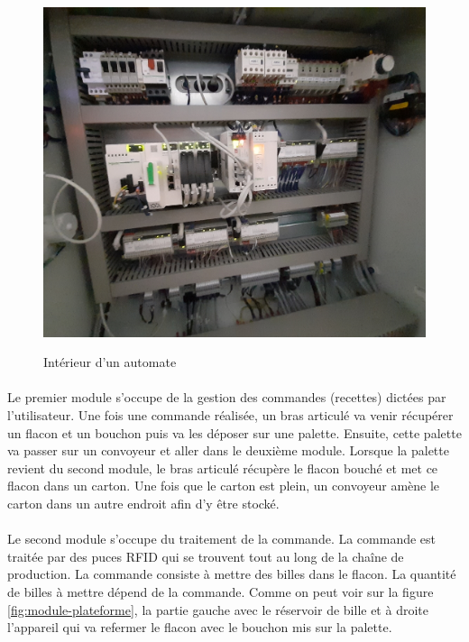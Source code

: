                 \begin{figure}[H]
                    \centering
                    \begin{frame}{\includegraphics[width=1\textwidth]{image/automate.jpg}}
                    \end{frame}
                    \caption{\label{fig:int-automate}Intérieur d'un automate}
                \end{figure}
                
                \paragraph*{}
                Le premier module s'occupe de la gestion des commandes (recettes) dictées par l'utilisateur. Une fois une commande réalisée, un bras articulé va venir récupérer un flacon et un bouchon puis va les déposer sur une palette. Ensuite, cette palette va passer sur un convoyeur et aller dans le deuxième module. Lorsque la palette revient du second module, le bras articulé récupère le flacon bouché et met ce flacon dans un carton. Une fois que le carton est plein, un convoyeur amène le carton dans un autre endroit afin d'y être stocké.
                
                \paragraph*{}
                Le second module s'occupe du traitement de la commande. La commande est traitée par des puces RFID qui se trouvent tout au long de la chaîne de production. La commande consiste à mettre des billes dans le flacon. La quantité de billes à mettre dépend de la commande. Comme on peut voir sur la figure \ref{fig:module-plateforme}, la partie gauche avec le réservoir de bille et à droite l'appareil qui va refermer le flacon avec le bouchon mis sur la palette.
                
